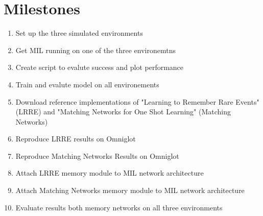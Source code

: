 \section{Milestones}
\begin{enumerate}
    \item Set up the three simulated environments 
    \item Get MIL running on one of the three environemtns
    \item Create script to evalute success and plot performance
    \item Train and evalute model on all environements
    \item Download reference implementations of "Learning to Remember Rare Events" 
          (LRRE) and "Matching Networks for One Shot Learning" (Matching Networks)
    \item Reproduce LRRE results on Omniglot
    \item Reproduce Matching Networks Results on Omniglot
    \item Attach LRRE memory module to MIL network architecture 
    \item Attach Matching Networks memory module to MIL network architecture
    \item Evaluate results both memory networks on all three environments
\end{enumerate}
